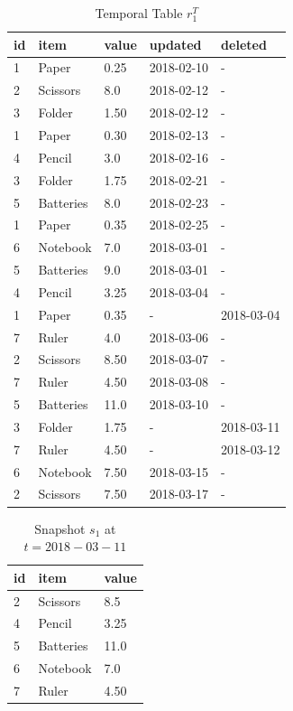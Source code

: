 			\begin{center}
			\begin{table}
				\centering
				\caption{Temporal Table $r_1^T$}
				\label {table:temporal_table_3}
				\begin{tabular}{p{1cm}p{2cm}p{3cm}p{3cm}p{2cm}}
					\hline
					id & item & value  & updated  & deleted\\ \hline
					1 & Paper & 0.25  & 2018-02-10  &  - \\  
					2 & Scissors & 8.0  & 2018-02-12  &  - \\
					3 & Folder & 1.50  & 2018-02-12  &  - \\
					1 & Paper & 0.30  & 2018-02-13  &  - \\
					4 & Pencil & 3.0  & 2018-02-16  &  - \\
					3 & Folder & 1.75  & 2018-02-21  &  - \\
					5 & Batteries & 8.0  & 2018-02-23  &  - \\
					1 & Paper & 0.35  & 2018-02-25  &  - \\
					6 & Notebook & 7.0  & 2018-03-01  &  - \\
					5 & Batteries & 9.0  & 2018-03-01  &  - \\
					4 & Pencil & 3.25  & 2018-03-04  &  - \\
					1 & Paper & 0.35  &  - &  2018-03-04 \\
					7 & Ruler & 4.0  & 2018-03-06  &  - \\
					2 & Scissors & 8.50  & 2018-03-07  &  - \\
					7 & Ruler & 4.50  & 2018-03-08  &  -\\
					5 & Batteries & 11.0  & 2018-03-10 & - \\
					3 & Folder & 1.75  & - & 2018-03-11 \\
					7 & Ruler & 4.50  & -  &  2018-03-12 \\
					6 & Notebook & 7.50  & 2018-03-15 & - \\ 
					2 & Scissors & 7.50  & 2018-03-17 & - \\ \hline
				\end{tabular}
			\end{table}
			\begin{table}
				\centering
				\caption{Snapshot $s_1$ at $t = 2018-03-11$}
				\label{table:snapshot_s1}
				\begin{tabular}{p{4cm}p{4cm}p{4cm}}
					\hline
					id & item  & value  \\ \hline
					2 & Scissors & 8.5   \\ 
					4 & Pencil & 3.25   \\ 
					5 & Batteries & 11.0   \\ 
					6 & Notebook & 7.0 \\ 
					7 & Ruler & 4.50   \\ \hline
				\end{tabular}
			\end{table}
			\end{center}

